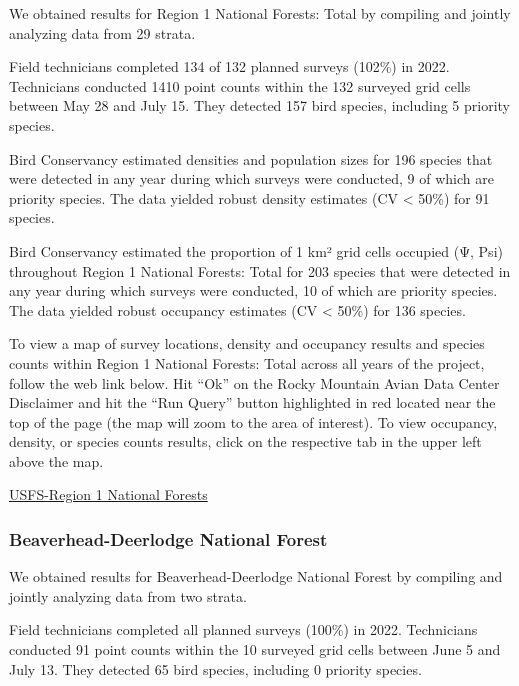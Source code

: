 \documentclass[
  letterpaper,
  DIV=11,
  numbers=noendperiod,
  oneside]{scrreprt}
\begin{document}
We obtained results for Region 1 National Forests: Total by compiling
and jointly analyzing data from 29 strata.

Field technicians completed 134 of 132 planned surveys (102\%) in 2022.
Technicians conducted 1410 point counts within the 132 surveyed grid
cells between May 28 and July 15. They detected 157 bird species,
including 5 priority species.

Bird Conservancy estimated densities and population sizes for 196
species that were detected in any year during which surveys were
conducted, 9 of which are priority species. The data yielded robust
density estimates (CV \textless{} 50\%) for 91 species.

Bird Conservancy estimated the proportion of 1 km² grid cells occupied
(Ψ, Psi) throughout Region 1 National Forests: Total for 203 species
that were detected in any year during which surveys were conducted, 10
of which are priority species. The data yielded robust occupancy
estimates (CV \textless{} 50\%) for 136 species.

To view a map of survey locations, density and occupancy results and
species counts within Region 1 National Forests: Total across all years
of the project, follow the web link below. Hit ``Ok'' on the Rocky
Mountain Avian Data Center Disclaimer and hit the ``Run Query'' button
highlighted in red located near the top of the page (the map will zoom
to the area of interest). To view occupancy, density, or species counts
results, click on the respective tab in the upper left above the map.

\href{http://www.rmbo.org/new_site/adc/QueryWindow.aspx\#N4IgzgrgDgpgTmALnAhoiBbEAuABCAVQGUAxIgWgCUYBzASwHsA7XARlwDk1GmUAbXCQZwYSMCAC+QA=}{USFS-Region
1 National Forests}

\hypertarget{beaverhead-deerlodge-national-forest}{%
\subsubsection{Beaverhead-Deerlodge National
Forest}\label{beaverhead-deerlodge-national-forest}}

We obtained results for Beaverhead-Deerlodge National Forest by
compiling and jointly analyzing data from two strata.

Field technicians completed all planned surveys (100\%) in 2022.
Technicians conducted 91 point counts within the 10 surveyed grid cells
between June 5 and July 13. They detected 65 bird species, including 0
priority species.
\end{document}
